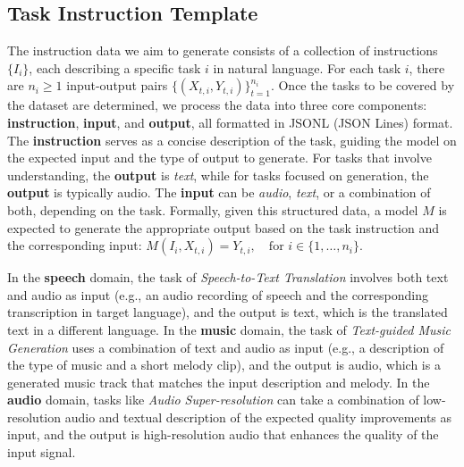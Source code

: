 



\subsection{Task Instruction Template}
The instruction data we aim to generate consists of a collection of instructions \( \{I_{i}\} \), each describing a specific task \( i \) in natural language. For each task \( i \), there are \( n_{i} \geq 1 \) input-output pairs \( \{(X_{t,i}, Y_{t,i})\}_{t=1}^{n_{i}} \). Once the tasks to be covered by the dataset are determined, we process the data into three core components: \textbf{instruction}, \textbf{input}, and \textbf{output}, all formatted in JSONL (JSON Lines) format. The \textbf{instruction} serves as a concise description of the task, guiding the model on the expected input and the type of output to generate. For tasks that involve understanding, the \textbf{output} is \textit{text}, while for tasks focused on generation, the \textbf{output} is typically audio. The \textbf{input} can be \textit{audio}, \textit{text}, or a combination of both, depending on the task. Formally, given this structured data, a model \( M \) is expected to generate the appropriate output based on the task instruction and the corresponding input: \( M(I_{i}, X_{t,i}) = Y_{t,i}, \quad \text{for } i \in \{1, \ldots, n_{i}\} \).


In the \textbf{speech} domain, the task of \textit{Speech-to-Text Translation} involves both text and audio as input (e.g., an audio recording of speech and the corresponding transcription in target language), and the output is text, which is the translated text in a different language. In the \textbf{music} domain, the task of \textit{Text-guided Music Generation} uses a combination of text and audio as input (e.g., a description of the type of music and a short melody clip), and the output is audio, which is a generated music track that matches the input description and melody. In the \textbf{audio} domain, tasks like \textit{Audio Super-resolution} can take a combination of low-resolution audio and textual description of the expected quality improvements as input, and the output is high-resolution audio that enhances the quality of the input signal.

